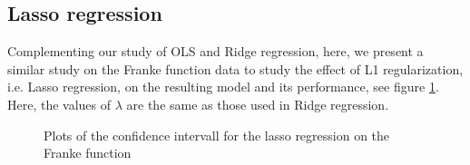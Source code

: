 \documentclass{article}
\begin{document}
\clearpage
\subsection{Lasso regression}
Complementing our study of OLS and Ridge regression, here, we present a similar study on the Franke function data to study the effect of L1 regularization, i.e. Lasso regression, on the resulting model and its performance, see figure \ref{LassoConfInt}. Here, the values of $\lambda$ are the same as those used in Ridge regression.
\begin{figure}[h]\centering
{}\hfill
{} \par
{}\hfill
{} \par
\caption{Plots of the confidence intervall for the lasso regression on the Franke function}
\label{LassoConfInt}
\end{figure}
\end{document}
